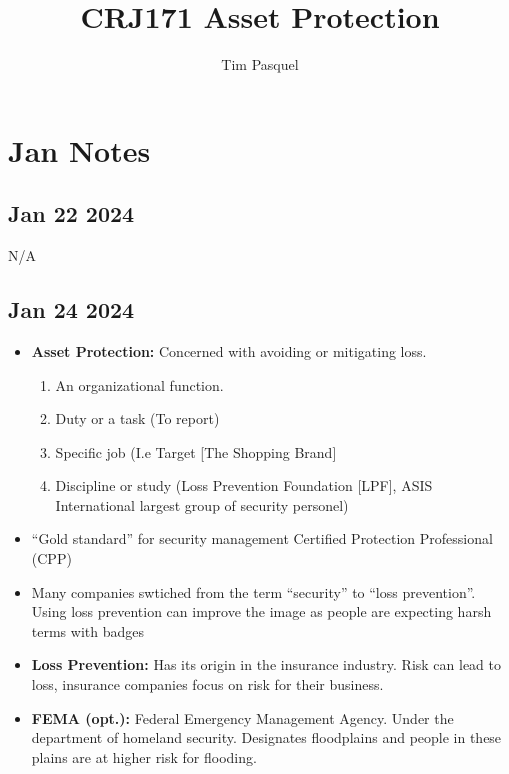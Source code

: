 \documentclass[12pt]{article}
\author{Tim Pasquel}
\title{CRJ171 Asset Protection}
\begin{document}
\maketitle

\titlepage

\section{Jan Notes}

\subsection{Jan 22 2024}

N/A

\subsection{Jan 24 2024}

\begin{itemize}
		  \item \textbf{Asset Protection:} Concerned with avoiding or mitigating loss. 
					 \begin{enumerate}
					 		\item An organizational function.
							\item Duty or a task (To report)
							\item Specific job (I.e Target [The Shopping Brand]
							\item Discipline or study (Loss Prevention Foundation [LPF],
									  ASIS International largest group of security personel)

					 \end{enumerate}
		  \item ``Gold standard'' for security management Certified Protection Professional
					(CPP)
		  \item Many companies swtiched from the term ``security'' to ``loss prevention''. Using
					 loss prevention can improve the image as people are expecting harsh terms with badges
		  \item \textbf{Loss Prevention:} Has its origin in the insurance industry. 
					 Risk can lead to loss, insurance companies focus on risk for their business.
		  \item \textbf{FEMA (opt.):} Federal Emergency Management Agency. Under the department of
					 homeland security. Designates floodplains and people in these plains are
					 at higher risk for flooding. 
\end{itemize}
\end{document}
